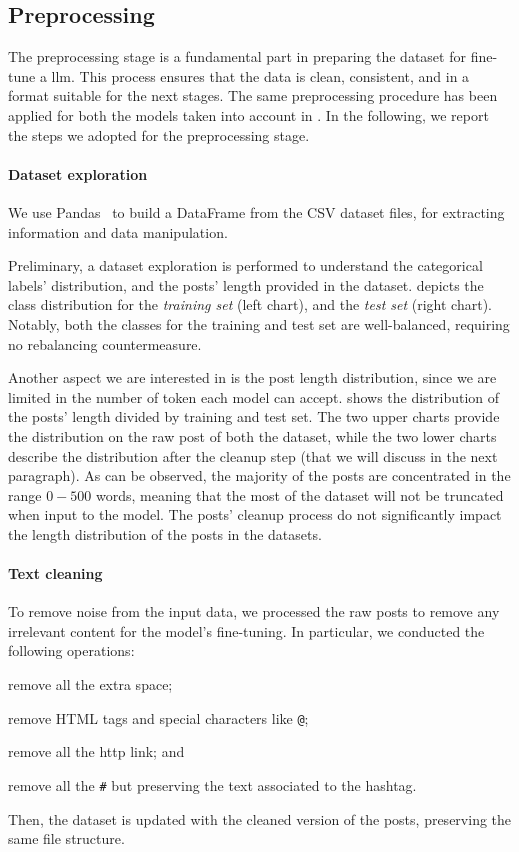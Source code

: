 \documentclass[11pt]{article}
\begin{document}
\begin{enumerate*}[label=(\roman*)]
\subsection{Preprocessing}\label{sec:preprocessing}
The preprocessing stage is a fundamental part in preparing the dataset for fine-tune a \ac{llm}.
%
This process ensures that the data is clean, consistent, and in a format suitable for the next stages.
%
The same preprocessing procedure has been applied for both the models taken into account in .
%
In the following,
we report the steps we adopted for the preprocessing stage.

\paragraph{Dataset exploration}
We use Pandas~\cite{reback2020pandas} to build a DataFrame from the CSV dataset files,
for extracting information and data manipulation.

Preliminary,
a dataset exploration is performed to understand the categorical labels' distribution,
and the posts' length provided in the dataset.
%
 depicts the class distribution for the \emph{training set} (left chart),
and the \emph{test set} (right chart).
%
Notably,
both the classes for the training and test set are well-balanced,
requiring no rebalancing countermeasure.

Another aspect we are interested in is the post length distribution,
since we are limited in the number of token each model can accept.
%
 shows the distribution of the posts' length divided by training and test set.
%
The two upper charts provide the distribution on the raw post of both the dataset,
while the two lower charts describe the distribution after the cleanup step (that we will discuss in the next paragraph).
%
As can be observed,
the majority of the posts are concentrated in the range $0-500$ words,
meaning that the most of the dataset will not be truncated when input to the model.
%
The posts' cleanup process do not significantly impact the length distribution of the posts in the datasets.

\paragraph{Text cleaning}
To remove noise from the input data,
we processed the raw posts to remove any irrelevant content for the model's fine-tuning.
%
In particular,
we conducted the following operations:
\begin{enumerate*}[label=(\roman{*})]
  \item remove all the extra space;
  \item remove HTML tags and special characters like \texttt{@};
  \item remove all the http link; and
  \item remove all the \texttt{\#} but preserving the text associated to the hashtag.
\end{enumerate*}
Then,
the dataset is updated with the cleaned version of the posts,
preserving the same file structure.



\end{enumerate*}
\end{document}
